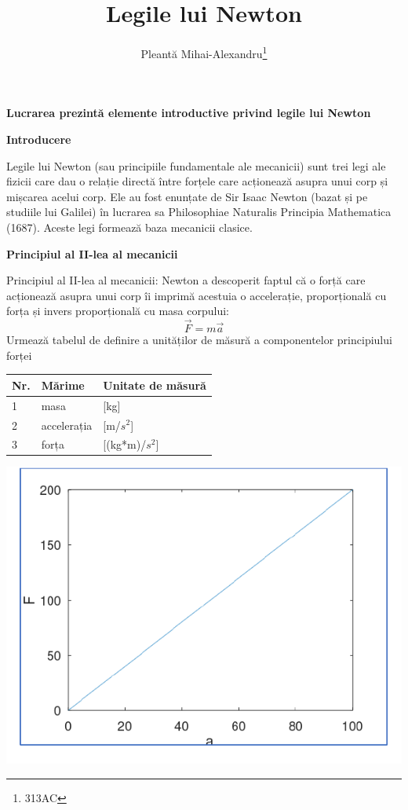 \documentclass{slides}
\title{Legile lui Newton}
\author{Pleantă Mihai-Alexandru\footnote{313AC}}
\date{}
\begin{document}
\maketitle
\textbf{Lucrarea prezintă elemente introductive privind legile lui Newton}
%
\begin{center}
\textbf{Introducere}
\end{center}
Legile lui Newton (sau principiile fundamentale ale mecanicii) sunt trei legi ale fizicii care dau o relație directă între forțele care acționează asupra unui corp și mișcarea acelui corp. Ele au fost enunțate de Sir Isaac Newton (bazat și pe studiile lui Galilei) în lucrarea sa Philosophiae Naturalis Principia Mathematica (1687). Aceste legi formează baza mecanicii clasice.
\begin{center}
\textbf{Principiul al II-lea al mecanicii}
\end{center}
Principiul al II-lea al mecanicii: Newton a descoperit faptul că o forță care acționează asupra unui corp îi imprimă acestuia o accelerație, proporțională cu forța și invers proporțională cu masa corpului:
\begin{equation}
\vec{F}=m\vec{a}
\end{equation}
Urmează tabelul de definire a unităților de măsură a componentelor principiului forței
\centering
\begin{tabular}{lll}
\hline
Nr.&Mărime&Unitate de măsură\\\hline
1&masa&[kg]\\\hline
2&accelerația&[m/$s^2$]\\\hline
3&forța&[(kg*m)/$s^2$]
\end{tabular}
\centering
\includegraphics[scale=0.8]{figura.pdf}
\end{document}
